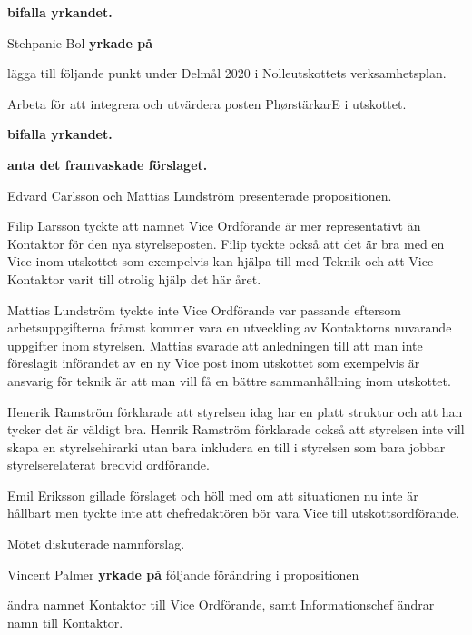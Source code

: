 \documentclass[10pt]{article}
\begin{document}
\begin{paragrafer}
\begin{paragrafer}
      \textbf{\Mba bifalla yrkandet.}

      Stehpanie Bol \textbf{yrkade på} 
      \begin{attsatser}
        \att lägga till följande punkt under Delmål 2020 i Nolleutskottets verksamhetsplan.
            \begin{dashlist}
              \item Arbeta för att integrera och utvärdera posten PhørstärkarE i utskottet.
            \end{dashlist}
      \end{attsatser}

      \textbf{\Mba bifalla yrkandet.}


      \textbf{\Mba anta det framvaskade förslaget.}


      Edvard Carlsson och Mattias Lundström presenterade propositionen.

      Filip Larsson tyckte att namnet Vice Ordförande är mer representativt än Kontaktor för den nya styrelseposten.
      Filip tyckte också att det är bra med en Vice inom utskottet som exempelvis kan hjälpa till med Teknik och att Vice Kontaktor varit till otrolig hjälp det här året. 

      Mattias Lundström tyckte inte Vice Ordförande var passande eftersom arbetsuppgifterna främst kommer vara en utveckling av Kontaktorns nuvarande uppgifter inom styrelsen.
      Mattias svarade att anledningen till att man inte föreslagit införandet av en ny Vice post inom utskottet som exempelvis är ansvarig för teknik är att man vill få en bättre sammanhållning inom utskottet. 

      Henerik Ramström förklarade att styrelsen idag har en platt struktur och att han tycker det är väldigt bra. Henrik Ramström förklarade också att styrelsen inte vill skapa en styrelsehirarki utan bara inkludera en till i styrelsen som bara jobbar styrelserelaterat bredvid ordförande. 

      Emil Eriksson gillade förslaget och höll med om att situationen nu inte är hållbart men tyckte inte att chefredaktören bör vara Vice till utskottsordförande. 

      Mötet diskuterade namnförslag. 

      Vincent Palmer \textbf{yrkade på} följande förändring i propositionen
      \begin{attsatser}
        \att ändra namnet Kontaktor till Vice Ordförande, samt
        \att Informationschef ändrar namn till Kontaktor. 
      \end{attsatser}


\end{paragrafer}
\end{paragrafer}
\end{document}
